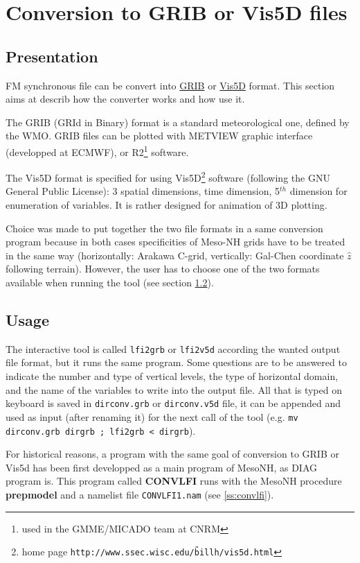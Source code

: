 \section{Conversion to GRIB or Vis5D files}

\subsection{Presentation}
FM synchronous file can be convert into \underline{GRIB} 
or \underline{Vis5D} format.
This section aims at describ how the converter works and how use it.

The GRIB (GRId in Binary) format is a standard meteorological one, defined 
by the WMO. GRIB files can be plotted with METVIEW
graphic interface (developped at ECMWF), or 
R2\footnote{used in the GMME/MICADO team at CNRM} software.

The Vis5D format is specified for using Vis5D\footnote{home page 
{\tt http://www.ssec.wisc.edu/\~ billh/vis5d.html}}
software (following the GNU General Public License): 3 spatial
dimensions, time dimension, 5$^{th}$ dimension for enumeration of variables.
It is rather designed for animation of 3D plotting.

Choice was made to put together the two file formats in a same conversion
program because in both cases specificities of Meso-NH grids have to be
treated in the same way (horizontally: Arakawa C-grid, vertically: Gal-Chen
coordinate $\hat z$ following terrain). However, the user has to choose one 
of the two formats available when running the tool
(see section \ref{s:execution}).


\subsection{Usage} \label{s:execution}
The interactive tool is
called {\tt lfi2grb} or {\tt lfi2v5d} according the wanted output
file format, but it runs the same program. Some questions are to be
answered to indicate the number and type of vertical levels, the type of
horizontal domain,
and the name of the variables to write into the output file.
All that is typed on keyboard is saved in {\tt dirconv.grb} or {\tt dirconv.v5d}
file, it can be appended and used as input (after renaming it) for the next call
of the tool (e.g. {\tt mv dirconv.grb dirgrb ; lfi2grb < dirgrb}).

For historical reasons, a program with the same goal of conversion to GRIB or 
Vis5d has been first developped as a main program
of MesoNH, as DIAG program is. This program called {\bf CONVLFI} runs with
the MesoNH procedure {\bf prepmodel} and
a namelist file {\tt CONVLFI1.nam} (see \ref{ss:convlfi}). 

